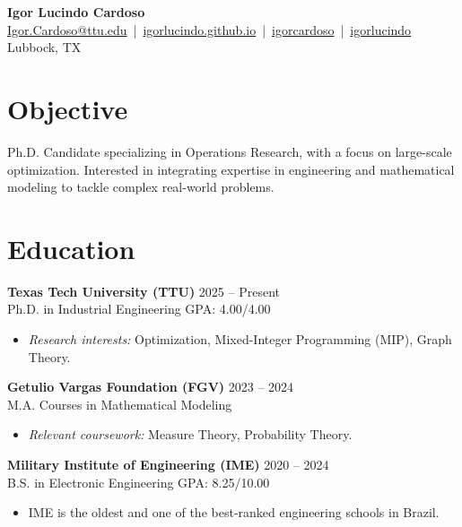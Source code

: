 \documentclass[letterpaper,10pt]{article}
\newcommand{\socialicon}[1]{\raisebox{-0.05em}{\resizebox{!}{1em}{#1}}}
\newcommand{\dategray}[1]{\textcolor{textgray}{#1}}
\begin{document}
\begin{center}
    {\Huge\textbf{Igor Lucindo Cardoso}}\\[4pt]
    \small{
    \href{mailto:Igor.Cardoso@ttu.edu}{Igor.Cardoso@ttu.edu} \,|\, 
    \socialicon{\faGlobe} \href{https://igorlucindo.github.io}{igorlucindo.github.io} \,|\, 
    \socialicon{\faLinkedin} \href{https://www.linkedin.com/in/igorlucindo/}{igorcardoso} \,|\, 
    \socialicon{\faGithub} \href{https://github.com/igorlucindo}{igorlucindo}
    }\\[2pt]
    \small{\dategray{Lubbock, TX}}
\end{center}
\vspace{-4pt}

\section{Objective}
\vspace{2pt}
\small{
Ph.D. Candidate specializing in Operations Research, with a focus on large-scale optimization. Interested in integrating expertise in engineering and mathematical modeling to tackle complex real-world problems.
}

\section{Education}
\textbf{Texas Tech University (TTU)} \hfill \dategray{2025 – Present} \\
Ph.D. in Industrial Engineering \hfill \dategray{GPA: 4.00/4.00}
\begin{itemize}[leftmargin=14pt, nosep, topsep=2pt, after=\vspace{4pt}]
    \item \textit{Research interests:} Optimization, Mixed-Integer Programming (MIP), Graph Theory.
\end{itemize}

\textbf{Getulio Vargas Foundation (FGV)} \hfill \dategray{2023 – 2024} \\
M.A. Courses in Mathematical Modeling
\begin{itemize}[leftmargin=14pt, nosep, topsep=2pt, after=\vspace{4pt}]
    \item \textit{Relevant coursework:} Measure Theory, Probability Theory.
\end{itemize}

\textbf{Military Institute of Engineering (IME)} \hfill \dategray{2020 – 2024} \\
B.S. in Electronic Engineering \hfill \dategray{GPA: 8.25/10.00}
\begin{itemize}[leftmargin=14pt, nosep, topsep=2pt]
    \item IME is the oldest and one of the best-ranked engineering schools in Brazil.
\end{itemize}
\end{document}
